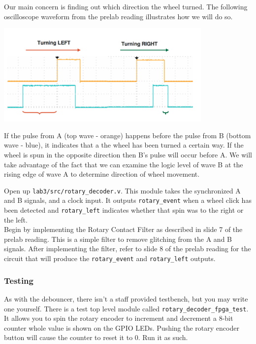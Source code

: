 \documentclass[11pt]{article}
\begin{document}
Our main concern is finding out which direction the wheel turned. The following oscilloscope waveform from the prelab reading illustrates how we will do so. 

\begin{center}
	\includegraphics[height=5cm]{images/lab2_fig6.png}
\end{center}

If the pulse from A (top wave - orange) happens before the pulse from B (bottom wave - blue), it indicates that a the wheel has been turned a certain way. If the wheel is spun in the opposite direction then B's pulse will occur before A. We will take advantage of the fact that we can examine the logic level of wave B at the rising edge of wave A to determine direction of wheel movement.

Open up \verb|lab3/src/rotary_decoder.v|. This module takes the synchronized A and B signals, and a clock input. It outputs \verb|rotary_event| when a wheel click has been detected and \verb|rotary_left| indicates whether that spin was to the right or the left.\\

Begin by implementing the Rotary Contact Filter as described in slide 7 of the prelab reading. This is a simple filter to remove glitching from the A and B signals. After implementing the filter, refer to slide 8 of the prelab reading for the circuit that will produce the \verb|rotary_event| and \verb|rotary_left| outputs.

\subsubsection{Testing}
As with the debouncer, there isn't a staff provided testbench, but you may write one yourself. There is a test top level module called \verb|rotary_decoder_fpga_test|. It allows you to spin the rotary encoder to increment and decrement a 8-bit counter whole value is shown on the GPIO LEDs. Pushing the rotary encoder button will cause the counter to reset it to 0. Run it as such.
\end{document}
